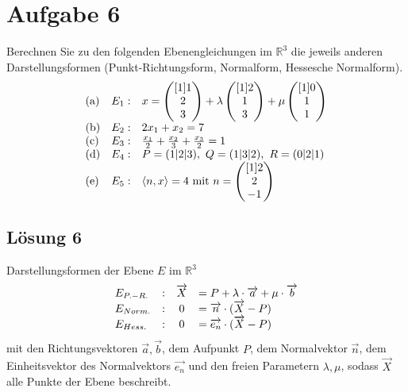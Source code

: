 \section{Aufgabe 6}

Berechnen Sie zu den folgenden Ebenengleichungen im $\displaystyle \mathbb{R}^{3}$ die jeweils anderen Darstellungsformen (Punkt-Richtungsform, Normalform, Hessesche Normalform).
\begin{equation*}
	\begin{array}{ l r l }
		\text{(a)} & E_{1} : & x=\begin{pmatrix}[1]
			1\\
			2\\
			3
		\end{pmatrix} +\lambda \begin{pmatrix}[1]
			2\\
			1\\
			3
		\end{pmatrix} +\mu \begin{pmatrix}[1]
			0\\
			1\\
			1
		\end{pmatrix}\\
		\text{(b)} & E_{2} : & 2x_{1} +x_{2} =7\\
		\text{(c)} & E_{3} : & \frac{x_{1}}{2} +\frac{x_{2}}{3} +\frac{x_{3}}{2} =1\\
		\text{(d)} & E_{4} : & P=( 1|2|3) ,\ Q=( 1|3|2) ,\ R=( 0|2|1)\\
		\text{(e)} & E_{5} : & \langle n,x\rangle =4\ \text{mit} \ n=\begin{pmatrix}[1]
			2\\
			2\\
			-1
		\end{pmatrix}
	\end{array}
\end{equation*}

\subsection{Lösung 6}

Darstellungsformen der Ebene $\displaystyle E$ im $\displaystyle \mathbb{R}^{3}$
\begin{equation*}
	\begin{array}{ l l c l }
		E_{P.-R.} & : & \vec{X} & =P+\lambda \cdotp \vec{a} +\mu \cdotp \vec{b}\\
		E_{Norm.} & : & 0 & =\vec{n} \cdotp (\vec{X} -P)\\
		E_{Hess.} & : & 0 & =\overrightarrow{e_{n}} \cdotp (\vec{X} -P)
	\end{array}
\end{equation*}
mit den Richtungsvektoren $\displaystyle \vec{a} ,\vec{b}$, dem Aufpunkt $\displaystyle P$, dem Normalvektor $\displaystyle \vec{n}$, dem Einheitsvektor des Normalvektors $\displaystyle \overrightarrow{e_{n}}$ und den freien Parametern $\displaystyle \lambda ,\mu $, sodass $\displaystyle \vec{X}$ alle Punkte der Ebene beschreibt.


